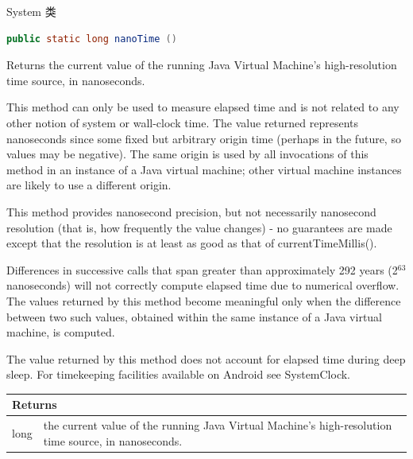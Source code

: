 \documentclass{beamer} %
\begin{document}
\begin{frame}{System 类}
    \begin{lstlisting}[language = Java]
public static long nanoTime ()
    \end{lstlisting}
    \small {
        Returns the current value of the running Java Virtual Machine's high-resolution time source, in nanoseconds.
        
        This method can only be used to measure elapsed time and is not related to any other notion of system or wall-clock time. 
        The value returned represents nanoseconds since some fixed but arbitrary origin time (perhaps in the future, so values may be negative). 
        The same origin is used by all invocations of this method in an instance of a Java virtual machine; 
        other virtual machine instances are likely to use a different origin.
        
        This method provides nanosecond precision, but not necessarily nanosecond resolution (that is, how frequently the value changes) - 
        no guarantees are made except that the resolution is at least as good as that of currentTimeMillis().

        Differences in successive calls that span greater than approximately 292 years (2$^{63}$ nanoseconds) will not correctly compute elapsed time due to numerical overflow.\\
        The values returned by this method become meaningful only when the difference between two such values, 
        obtained within the same instance of a Java virtual machine, is computed.
        
        The value returned by this method does not account for elapsed time during deep sleep. 
        For timekeeping facilities available on Android see SystemClock.
        
    }
    \begin{tabularx}{\textwidth}{l|X}
        \toprule
        \multicolumn{2}{l}{Returns}\\
        \midrule
        long & the current value of the running Java Virtual Machine's high-resolution time source, in nanoseconds.\\
        \bottomrule
    \end{tabularx}
\end{frame}
\end{document}
